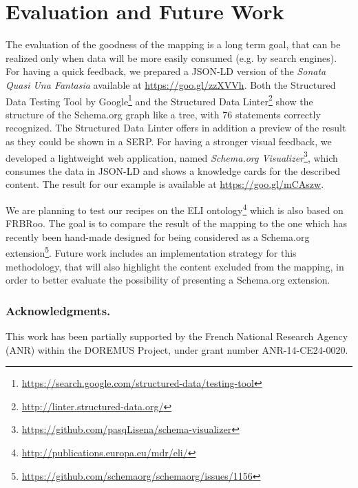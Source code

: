 \documentclass{llncs}
\begin{document}

\section{Evaluation and Future Work}
\label{sec:evaluation}
The evaluation of the goodness of the mapping is a long term goal, that can be realized only when data will be more easily consumed (e.g. by search engines). For having a quick feedback, we prepared a JSON-LD version of the \textit{Sonata Quasi Una Fantasia} available at \url{https://goo.gl/zzXVVh}.
Both the Structured Data Testing Tool by Google\footnote{\url{https://search.google.com/structured-data/testing-tool}} and the Structured Data Linter\footnote{\url{http://linter.structured-data.org/}} show the structure of the Schema.org graph like a tree, with 76 statements correctly recognized. The Structured Data Linter offers in addition a preview of the result as they could be shown in a SERP. For having a stronger visual feedback, we developed a lightweight web application, named \emph{Schema.org Visualizer}\footnote{\url{https://github.com/pasqLisena/schema-visualizer}}, which consumes the data in JSON-LD and shows a knowledge cards for the described content. The result for our example is available at \url{https://goo.gl/mCAszw}.

We are planning to test our recipes on the ELI ontology\footnote{\url{http://publications.europa.eu/mdr/eli/}} which is also based on FRBRoo. The goal is to compare the result of the mapping to the one which has recently been hand-made designed for being considered as a Schema.org extension\footnote{\url{https://github.com/schemaorg/schemaorg/issues/1156}}. Future work includes an implementation strategy for this methodology, that will also highlight the content excluded from the mapping, in order to better evaluate the possibility of presenting a Schema.org extension.

\subsubsection*{Acknowledgments.}
This work has been partially supported by the French National Research Agency (ANR) within the DOREMUS Project, under grant number ANR-14-CE24-0020.




\newpage
\end{document}
